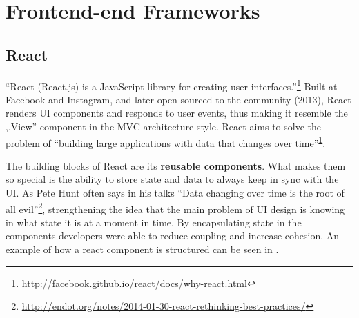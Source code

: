 \section{Frontend-end Frameworks}
\label{sec:frontend}

\subsection{React}
\label{sub-sec:react}

``React (React.js) is a JavaScript library for creating user interfaces.''\footnote{\label{why-react}\url{http://facebook.github.io/react/docs/why-react.html}} Built at Facebook and Instagram, and later open-sourced to the community (2013), React renders UI components and responds to user events, thus making it resemble the ,,View'' component in the MVC architecture style. React aims to solve the problem of ``building large applications with data that changes over time''\textsuperscript{\ref{why-react}}.

The building blocks of React are its \textbf{reusable components}. What makes them so special is the ability to store state and data to always keep in sync with the UI. As Pete Hunt often says in his talks ``Data changing over time is the root of all evil''\footnote{\url{http://endot.org/notes/2014-01-30-react-rethinking-best-practices/}}, strengthening the idea that the main problem of UI design is knowing in what state it is at a moment in time. By encapsulating state in the components developers were able to reduce coupling and increase cohesion. An example of how a react component is structured can be seen in .



